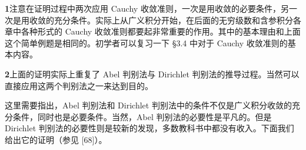 \begin{xremark}
\textbf{1}\quad 注意在证明过程中两次应用 Cauchy 收敛准则，一次是用收敛的必要条件，另一次是用收敛的充分条件。实际上从广义积分开始，在后面的无穷级数和含参积分各章中各种形式的 Cauchy 收敛准则都要起非常重要的作用。其中的基本理由和上面这个简单例题是相同的。初学者可以复习一下 §3.4 中对于 Cauchy 收敛准则的基本内容。
\end{xremark}

\begin{xremark}
\textbf{2}\quad 上面的证明实际上重复了 Abel 判别法与 Dirichlet 判别法的推导过程。当然可以直接应用这两个判别法之一来达到目的。

这里需要指出，Abel 判别法和 Dirichlet 判别法中的条件不仅是广义积分收敛的充分条件，同时也是必要条件。当然，Abel 判别法的必要性是平凡的。但是 Dirichlet 判别法的必要性则是较新的发现，多数教科书中都没有收入。下面我们给出它的证明（参见 [68]）。
\end{xremark}

